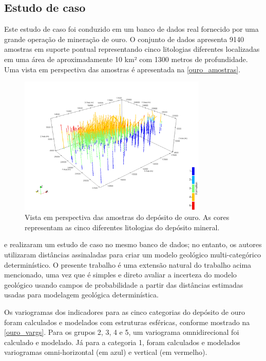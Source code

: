 \begin{figure}[H]
\end{figure}

\subsection{Estudo de caso}\label{estudo_ouro}

Este estudo de caso foi conduzido em um banco de dados real fornecido por uma grande operação de mineração de ouro. O conjunto de dados apresenta 9140 amostras em suporte pontual representando cinco litologias diferentes localizadas em uma área de aproximadamente 10 km² com 1300 metros de profundidade. Uma vista em perspectiva das amostras é apresentada na \autoref{ouro_amostras}.

\begin{figure}[H]
	\caption{\label{ouro_amostras} Vista em perspectiva das amostras do depósito de ouro. As cores representam as cinco diferentes litologias do depósito mineral.}
	\centering
		\includegraphics[width=0.8\textwidth]{capitulo_3/imagens/points_perpect.png}
\end{figure}

 e  realizaram um estudo de caso no mesmo banco de dados; no entanto, os autores utilizaram distâncias assinaladas para criar um modelo geológico multi-categórico determinístico. O presente trabalho é uma extensão natural do trabalho acima mencionado, uma vez que é simples e direto avaliar a incerteza do modelo geológico usando campos de probabilidade a partir das distâncias estimadas usadas para modelagem geológica determinística.

Os variogramas dos indicadores para as cinco categorias do depósito de ouro foram calculados e modelados com estruturas esféricas, conforme mostrado na \autoref{ouro_vargs}. Para os grupos 2, 3, 4 e 5, um variograma omnidirecional foi calculado e modelado. Já para a categoria 1, foram calculados e modelados variogramas omni-horizontal (em azul) e vertical (em vermelho).

